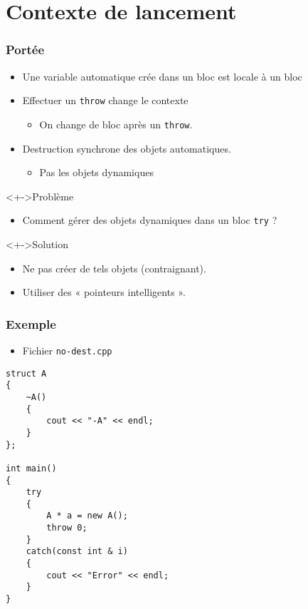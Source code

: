 \section{Contexte de lancement}

\begin{frame}
\frametitle{Portée}
\begin{itemize}[<+->]
\item Une variable automatique crée dans un bloc est locale à un bloc
\item Effectuer un \lstinline|throw| change le contexte
	\begin{itemize}
	\item On change de bloc après un \lstinline|throw|.
	\end{itemize}
\item Destruction synchrone des objets automatiques.
	\begin{itemize}
	\item Pas les objets dynamiques
	\end{itemize}
\end{itemize}
\begin{alertblock}<+->{Problème}
	\begin{itemize}[<+->]
	\item Comment gérer des objets dynamiques dans un bloc \lstinline|try|  ?
	\end{itemize}
\end{alertblock}
\begin{exampleblock}<+->{Solution}
	\begin{itemize}[<+->]
	\item Ne pas créer de tels objets (contraignant).
	\item Utiliser des « pointeurs intelligents ».
	\end{itemize}
\end{exampleblock}
\end{frame}

\begin{frame}[containsverbatim]
\frametitle{Exemple}
\begin{itemize}
\item Fichier \texttt{no-dest.cpp}
\end{itemize}
\begin{lstlisting}
struct A 
{
	~A()
	{
		cout << "-A" << endl;
	}
};

int main()
{
	try
	{
		A * a = new A();
		throw 0;
	}
	catch(const int & i)
	{
		cout << "Error" << endl;
	}
}
\end{lstlisting}
\end{frame}

